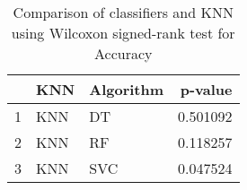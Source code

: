 \begin{table}
\footnotesize
\caption{Comparison of classifiers and KNN using Wilcoxon signed-rank test for Accuracy}
\label{tab:KNN wilcoxon Accuracy comparison}
\begin{tabular}{lllr}
\hline
 & KNN & Algorithm & p-value \\
\hline
1 & KNN & DT & 0.501092 \\
2 & KNN & RF & 0.118257 \\
3 & KNN & SVC & 0.047524 \\
\hline
\end{tabular}
\end{table}
